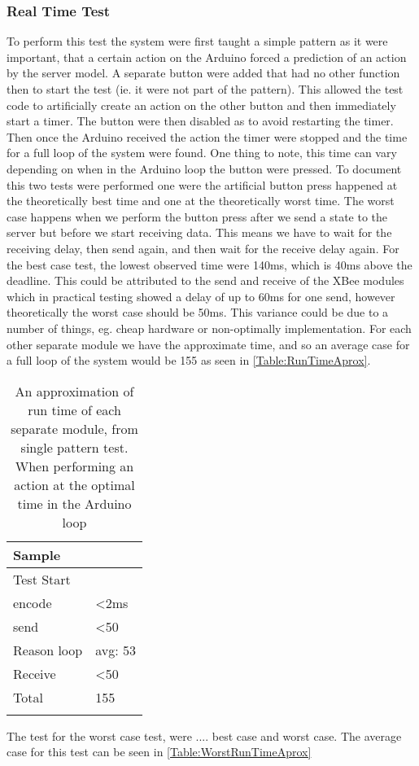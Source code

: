 \subsubsection{Real Time Test}
To perform this test the system were first taught a simple pattern as it were important, that a certain action on the Arduino forced a prediction of an action by the server model. A separate button were added that had no other function then to start the test (ie. it were not part of the pattern). This allowed the test code to artificially create an action on the other button and then immediately start a timer. The button were then disabled as to avoid restarting the timer. Then once the Arduino received the action the timer were stopped and the time for a full loop of the system were found. One thing to note, this time can vary depending on when in the Arduino loop the button were pressed. To document this two tests were performed one were the artificial button press happened at the theoretically best time and one at the theoretically worst time. The worst case happens when we perform the button press after we send a state to the server but before we start receiving data. This means we have to wait for the receiving delay, then send again, and then wait for the receive delay again. For the best case test, the lowest observed time were 140ms, which is 40ms above the deadline. This could be attributed to the send and receive of the XBee modules which in practical testing showed a delay of up to 60ms for one send, however theoretically the worst case should be 50ms\cite{xbee_latency}. This variance could be due to a number of things, eg. cheap hardware or non-optimally implementation. For each other separate module we have the approximate time, and so an average case for a full loop of the system would be 155 as seen in \cref{Table:RunTimeAprox}.
\begin{center}
	\begin{table}[htbp]
	  \centering
	  \begin{tabular}{l | l}
		\toprule
		Sample  		& 			\\ \midrule
		Test Start		&     \\
		encode 			& <2ms  	\\
		send   			& <50  		\\
		Reason loop 	& avg: 53 	\\
		Receive 		& <50  		\\
		Total			& 155		\\
									\\ \bottomrule
	  \end{tabular}
	  \caption{An approximation of run time of each separate module, from single pattern test. When performing an action at the optimal time in the Arduino loop}
	\end{table}
 \label{Table:RunTimeAprox}
\end{center}
The test for the worst case test, were .... best case and worst case.
The average case for this test can be seen in \cref{Table:WorstRunTimeAprox}

